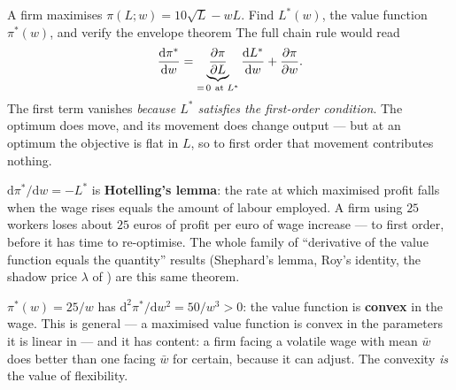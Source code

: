 \begin{worked}{A firm maximises $\pi(L;w)=10\sqrt L-wL$. Find $L^{*}(w)$, the value function $\pi^{*}(w)$, and verify the envelope theorem}
The full chain rule would read
\[
  \frac{\mathrm{d}\pi^{*}}{\mathrm{d}w}
  =\underbrace{\frac{\partial \pi}{\partial L}}_{=\,0\ \text{at }L^{*}}\frac{\mathrm{d}L^{*}}{\mathrm{d}w}
   +\frac{\partial \pi}{\partial w} .
\]
The first term vanishes \emph{because $L^{*}$ satisfies the first-order
condition}. The optimum does move, and its movement does change output ---
but at an optimum the objective is flat in $L$, so to first order that
movement contributes nothing.

$\mathrm{d}\pi^{*}/\mathrm{d}w=-L^{*}$ is \textbf{Hotelling's lemma}: the
rate at which maximised profit falls when the wage rises equals the amount
of labour employed. A firm using $25$ workers loses about $25$ euros of
profit per euro of wage increase --- to first order, before it has time to
re-optimise. The whole family of ``derivative of the value function equals
the quantity'' results (Shephard's lemma, Roy's identity, the shadow price
$\lambda$ of ) are this same theorem.

$\pi^{*}(w)=25/w$ has $\mathrm{d}^{2}\pi^{*}/\mathrm{d}w^{2}=50/w^{3}>0$:
the value function is \textbf{convex} in the wage. This is general --- a
maximised value function is convex in the parameters it is linear in ---
and it has content: a firm facing a volatile wage with mean $\bar w$ does
better than one facing $\bar w$ for certain, because it can adjust. The
convexity \emph{is} the value of flexibility.
\end{worked}


